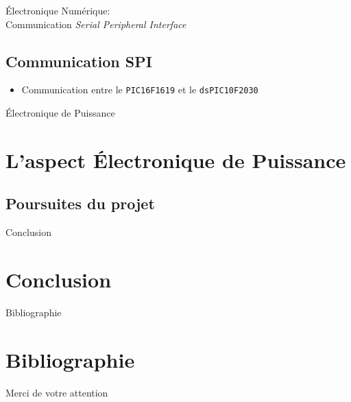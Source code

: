 \documentclass{beamer}
\begin{document}
	\begin{frame}{Électronique Numérique:\\Communication \textit{Serial Peripheral Interface}}
		\subsection[SPI]{Communication SPI}
		\begin{itemize}
		    \item Communication entre le \texttt{PIC16F1619} et le \texttt{dsPIC10F2030}
		\end{itemize}
	\end{frame}
	\author[]{Florian POUTHIER}
	\begin{frame}{Électronique de Puissance}
		\section[ENPU]{L'aspect Électronique de Puissance}
		
		
	\end{frame}
	\begin{frame}
		\section[Poursuites]{Poursuites du projet}
	\end{frame}
	
	\begin{frame}{Conclusion}
	\section*{Conclusion}
	\end{frame}
	\begin{frame}{Bibliographie}
	\section*{Bibliographie}
		 
		
	\end{frame}
	\begin{frame}[plain]{Merci de votre attention}
	\section*{}
		\titlepage
	\end{frame}
\end{document}
